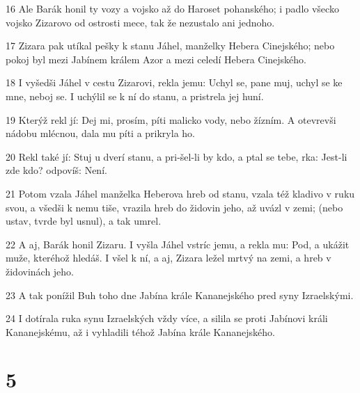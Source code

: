 \par 16 Ale Barák honil ty vozy a vojsko až do Haroset pohanského; i padlo všecko vojsko Zizarovo od ostrosti mece, tak že nezustalo ani jednoho.
\par 17 Zizara pak utíkal pešky k stanu Jáhel, manželky Hebera Cinejského; nebo pokoj byl mezi Jabínem králem Azor a mezi celedí Hebera Cinejského.
\par 18 I vyšedši Jáhel v cestu Zizarovi, rekla jemu: Uchyl se, pane muj, uchyl se ke mne, neboj se. I uchýlil se k ní do stanu, a pristrela jej huní.
\par 19 Kterýž rekl jí: Dej mi, prosím, píti malicko vody, nebo žízním. A otevrevši nádobu mlécnou, dala mu píti a prikryla ho.
\par 20 Rekl také jí: Stuj u dverí stanu, a pri-šel-li by kdo, a ptal se tebe, rka: Jest-li zde kdo? odpovíš: Není.
\par 21 Potom vzala Jáhel manželka Heberova hreb od stanu, vzala též kladivo v ruku svou, a všedši k nemu tiše, vrazila hreb do židovin jeho, až uvázl v zemi; (nebo ustav, tvrde byl usnul), a tak umrel.
\par 22 A aj, Barák honil Zizaru. I vyšla Jáhel vstríc jemu, a rekla mu: Pod, a ukážit muže, kteréhož hledáš. I všel k ní, a aj, Zizara ležel mrtvý na zemi, a hreb v židovinách jeho.
\par 23 A tak ponížil Buh toho dne Jabína krále Kananejského pred syny Izraelskými.
\par 24 I dotírala ruka synu Izraelských vždy více, a silila se proti Jabínovi králi Kananejskému, až i vyhladili téhož Jabína krále Kananejského.

\chapter{5}

